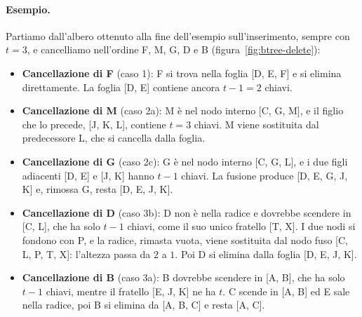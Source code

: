 \paragraph{Esempio.}
Partiamo dall'albero ottenuto alla fine dell'esempio sull'inserimento, sempre con $t = 3$, e cancelliamo nell'ordine F, M, G, D e B (figura~\ref{fig:btree-delete}):
\begin{itemize}
    \item \textbf{Cancellazione di F} (caso 1): F si trova nella foglia [D, E, F] e si elimina direttamente. La foglia [D, E] contiene ancora $t-1 = 2$ chiavi.
    \item \textbf{Cancellazione di M} (caso 2a): M è nel nodo interno [C, G, M], e il figlio che lo precede, [J, K, L], contiene $t = 3$ chiavi. M viene sostituita dal predecessore L, che si cancella dalla foglia.
    \item \textbf{Cancellazione di G} (caso 2c): G è nel nodo interno [C, G, L], e i due figli adiacenti [D, E] e [J, K] hanno $t-1$ chiavi. La fusione produce [D, E, G, J, K] e, rimossa G, resta [D, E, J, K].
    \item \textbf{Cancellazione di D} (caso 3b): D non è nella radice e dovrebbe scendere in [C, L], che ha solo $t-1$ chiavi, come il suo unico fratello [T, X]. I due nodi si fondono con P, e la radice, rimasta vuota, viene sostituita dal nodo fuso [C, L, P, T, X]: l'altezza passa da $2$ a $1$. Poi D si elimina dalla foglia [D, E, J, K].
    \item \textbf{Cancellazione di B} (caso 3a): B dovrebbe scendere in [A, B], che ha solo $t-1$ chiavi, mentre il fratello [E, J, K] ne ha $t$. C scende in [A, B] ed E sale nella radice, poi B si elimina da [A, B, C] e resta [A, C].
\end{itemize}


